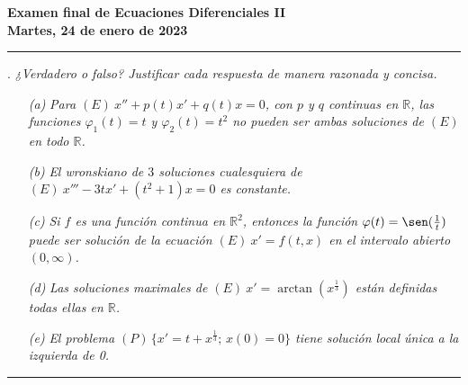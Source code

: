 \documentclass[11pt]{report}
\newcommand{\R}{\mathbb R}
\begin{document}
\begin{center}
    \textbf{Examen final de Ecuaciones Diferenciales II} \\
    \textbf{Martes, 24 de enero de 2023}
\end{center}

\hrule

\vspace{4mm}

. \textit{¿Verdadero o falso? Justificar cada respuesta de manera razonada y concisa.}
\begin{itemize}
    \item[\textit{(a)}] \textit{Para $(E) \ x''+p(t)x'+q(t)x=0$, con $p$ y $q$ continuas en $\R$, las funciones $\varphi_1(t)=t$ y $\varphi_2(t)=t^2$ no pueden ser ambas soluciones de $(E)$ en todo $\R$.}
    \item[\textit{(b)}] \textit{El wronskiano de $3$ soluciones cualesquiera de $(E) \ x'''-3tx'+(t^2+1)x=0$ es constante.}
    \item[\textit{(c)}] \textit{Si $f$ es una función continua en $\R^2$, entonces la función $\varphi(t)=\sen(\frac{1}{t})$ puede ser solución de la ecuación $(E) \ x'=f(t,x)$ en el intervalo abierto $(0,\infty)$.}
    \item[\textit{(d)}] \textit{Las soluciones maximales de $(E) \ x'=\arctan(x^{\frac{1}{3}})$ están definidas todas ellas en $\R$.}
    \item[\textit{(e)}] \textit{El problema $(P) \, \bigl\{x'=t+x^{\frac{1}{3}}; \, x(0)=0\bigr\}$ tiene solución local única a la izquierda de 0.}
\end{itemize}

\vspace{2mm}

\hrule

\vspace{2mm}
\end{document}
